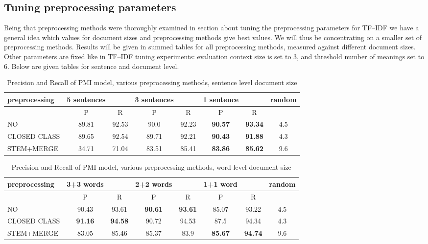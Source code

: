\subsection{Tuning preprocessing parameters}
Being that preprocessing methods were thoroughly examined in section about tuning the preprocessing 
parameters for TF--IDF we have a general idea which values for document sizes and preprocessing 
methods give best values. We will thus be concentrating on a smaller set of preprocessing methods. 
Results will be given in summed tables for all preprocessing methods, measured against different 
document sizes.  Other parameters are fixed like in TF--IDF tuning experiments: 
evaluation context size is set to 3, and threshold number of meanings set to 6.
Below are given tables for sentence and document level. 
\begin{table}[h!]
\begin{tabular}{ l | c c | c c | c c | c}
   preprocessing &  5 sentences && 3 sentences && 1 sentence  && random\\
\hline
	& P  &  R & P  &  R & P  &  R &\\
\hline\hline
NO & 89.81  & 92.53  & 90.0  &  92.23 & \textbf{90.57}  & \textbf{93.34}  & 4.5  \\
CLOSED CLASS & 89.65  & 92.54  & 89.71  & 92.21  & \textbf{90.43}  & \textbf{91.88}  & 4.3  \\
STEM+MERGE & 34.71  & 71.04  & 83.51  & 85.41  & \textbf{83.86}  & \textbf{85.62} & 9.6  \\
\end{tabular}
\caption{Precision and Recall of PMI model, various preprocessing methods, sentence level document size}
\end{table}

\begin{table}[h!]
\begin{tabular}{ l | c c | c c | c c | c}
   preprocessing &  3+3 words && 2+2 words && 1+1 word  && random\\
\hline\hline
	& P  &  R & P  &  R & P  &  R &\\
\hline
NO & 90.43   &  93.61 & \textbf{90.61}  &  \textbf{93.61} & 85.07  & 93.22  & 4.5\\
CLOSED CLASS &  \textbf{91.16} & \textbf{94.58}  & 90.72  & 94.53  & 87.5  & 94.34  & 4.3\\
STEM+MERGE  & 83.05  &  85.46 & 85.37  & 83.9  & \textbf{85.67}  & \textbf{94.74}  & 9.6\\
\end{tabular}
\caption{Precision and Recall of PMI model,  various preprocessing methods, word level document size}
\end{table}

